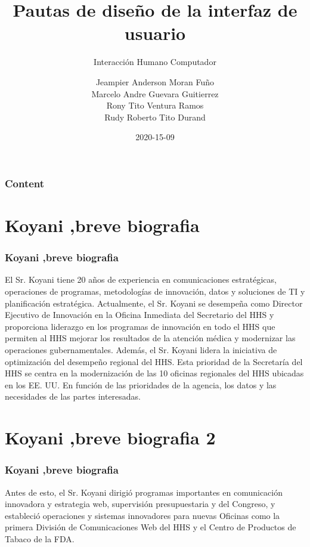 \documentclass[11pt]{beamer}
\title[Introducción]{\bf\Huge Pautas de diseño de la interfaz de usuario}
\subtitle{Interacción Humano Computador}
\author[rescobedoq]
{
	Jeampier Anderson Moran Fuño \inst{1}\\
	Marcelo Andre Guevara Guitierrez\inst{1}\\
	Rony Tito Ventura Ramos\inst{1}\\
	Rudy Roberto Tito Durand\inst{1}
}
\institute[UNSA]
{
\inst{1}%
System Engineering School\\
System Engineering and Informatic Department\\
Production and Services Faculty\\
San Agustin National University of Arequipa
}
\date[2020-15-09]{\scriptsize{2020-15-09}}
\begin{document}
\begin{frame}
\titlepage
\end{frame}

\begin{frame}
\frametitle{Content}

\tableofcontents
\end{frame}

\section{Koyani ,breve biografia}
\begin{frame}
\frametitle{Koyani ,breve biografia}
El Sr. Koyani tiene 20 años de experiencia en comunicaciones estratégicas, operaciones de programas, metodologías de innovación, datos y soluciones de TI y planificación estratégica. Actualmente, el Sr. Koyani se desempeña como Director Ejecutivo de Innovación en la Oficina Inmediata del Secretario del HHS y proporciona liderazgo en los programas de innovación en todo el HHS que permiten al HHS mejorar los resultados de la atención médica y modernizar las operaciones gubernamentales. Además, el Sr. Koyani lidera la iniciativa de optimización del desempeño regional del HHS. Esta prioridad de la Secretaría del HHS se centra en la modernización de las 10 oficinas regionales del HHS ubicadas en los EE. UU. En función de las prioridades de la agencia, los datos y las necesidades de las partes interesadas.
\end{frame}

\section{Koyani ,breve biografia 2}
\begin{frame}
\frametitle{Koyani ,breve biografia}
Antes de esto, el Sr. Koyani dirigió programas importantes en comunicación innovadora y estrategia web, supervisión presupuestaria y del Congreso, y estableció operaciones y sistemas innovadores para nuevas Oficinas como la primera División de Comunicaciones Web del HHS y el Centro de Productos de Tabaco de la FDA.
\end{frame}
\end{document}
